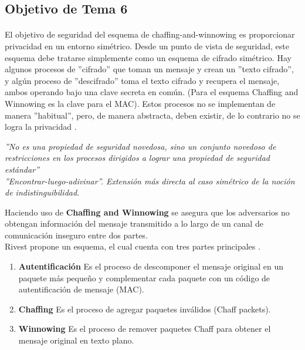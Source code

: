 \documentclass[12pt, a4paper, titlepage]{report}
\begin{document}
		\subsection{Objetivo de Tema 6}
		
		\paragraph{}
		El objetivo de seguridad del esquema de chaffing-and-winnowing es proporcionar privacidad en un entorno simétrico. 
        Desde un punto de vista de seguridad, este esquema debe tratarse simplemente como un esquema de cifrado simétrico. Hay algunos procesos de ''cifrado'' que toman un mensaje y crean un ''texto cifrado'', y algún proceso de ''descifrado'' toma el texto cifrado y recupera el mensaje, ambos operando bajo una clave secreta en com\'un. (Para el esquema Chaffing and Winnowing es la clave para el MAC). Estos procesos no se implementan de manera ''habitual'', pero, de manera abstracta, deben existir, de lo contrario no se logra la privacidad  \cite{refRivestSeguridad} \cite{refEncontrarLuegoAdivinar}.  
        \begin{center}
            \textit{''No es una propiedad de seguridad novedosa, sino un conjunto novedoso de restricciones en los procesos dirigidos a lograr una propiedad de seguridad estándar''\\
            ''Encontrar-luego-adivinar''. Extensión más directa al caso simétrico de la noción de indistinguibilidad.}
        \end{center}
		
		Haciendo uso de \textbf{Chaffing and Winnowing} se asegura que los adversarios no obtengan información del mensaje transmitido a lo largo de un canal de comunicación inseguro entre dos partes. \\
		Rivest propone un esquema, el cual cuenta con tres partes principales \cite{refCryptohraphyWithoutEncryption}.
		\begin{enumerate}
		    \item \textbf{Autentificación} Es el proceso de descomponer el mensaje original en un paquete más pequeño y complementar cada paquete con un código de autentificación de mensaje (MAC).
		    \item \textbf{Chaffing} Es el proceso de agregar paquetes inválidos (Chaff packets).
		    \item \textbf{Winnowing} Es el proceso de remover paquetes Chaff para obtener el mensaje original en texto plano.
		\end{enumerate}
		
\end{document}
